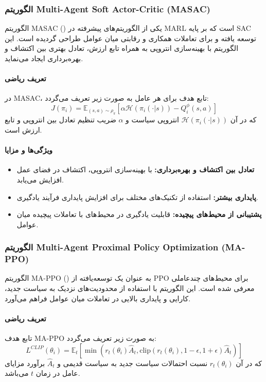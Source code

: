 \subsubsection{الگوریتم Multi-Agent Soft Actor-Critic (MASAC)}

الگوریتم MASAC () یکی از الگوریتم‌های پیشرفته در MARL است که بر پایه SAC توسعه یافته و برای تعاملات همکاری و رقابتی میان عوامل طراحی گردیده است. این الگوریتم با بهینه‌سازی انتروپی به همراه تابع ارزش، تعادل بهتری بین اکتشاف و بهره‌برداری ایجاد می‌نماید.

\paragraph{تعریف ریاضی}
در MASAC، تابع هدف برای هر عامل به صورت زیر تعریف می‌گردد:
\[
J(\pi_i) = \mathbb{E}_{(s,a) \sim \rho_{\pi}} \left[ \alpha \mathcal{H}(\pi_i(\cdot|s)) - Q_i^{\phi}(s,a) \right]
\]
که در آن \( \mathcal{H}(\pi_i(\cdot|s)) \) انتروپی سیاست و \( \alpha \) ضریب تنظیم تعادل بین انتروپی و تابع ارزش است.

\paragraph{ویژگی‌ها و مزایا}
\begin{itemize}
	\item \textbf{تعادل بین اکتشاف و بهره‌برداری:} با بهینه‌سازی انتروپی، اکتشاف در فضای عمل افزایش می‌یابد.
	\item \textbf{پایداری بیشتر:} استفاده از تکنیک‌های مختلف برای افزایش پایداری فرآیند یادگیری.
	\item \textbf{پشتیبانی از محیط‌های پیچیده:} قابلیت یادگیری در محیط‌های با تعاملات پیچیده میان عوامل.
\end{itemize}

\subsubsection{الگوریتم Multi-Agent Proximal Policy Optimization (MA-PPO)}

الگوریتم MA-PPO () به عنوان یک توسعه‌یافته از PPO برای محیط‌های چندعاملی معرفی شده است. این الگوریتم با استفاده از محدودیت‌های نزدیک به سیاست جدید، کارایی و پایداری بالایی در تعاملات میان عوامل فراهم می‌آورد.

\paragraph{تعریف ریاضی}
تابع هدف MA-PPO به صورت زیر تعریف می‌گردد:
\[
L^{CLIP}(\theta_i) = \mathbb{E}_t \left[ \min \left( r_t(\theta_i) \hat{A}_t, \text{clip}(r_t(\theta_i), 1-\epsilon, 1+\epsilon) \hat{A}_t \right) \right]
\]
که در آن \( r_t(\theta_i) \) نسبت احتمالات سیاست جدید به سیاست قدیمی و \( \hat{A}_t \) برآورد مزایای عامل در زمان \( t \) می‌باشد.

